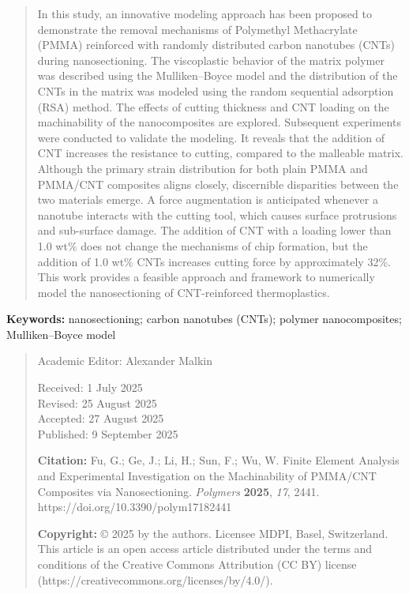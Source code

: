 \documentclass{article}
\begin{document}
\begin{quote}
In this study, an innovative modeling approach has been proposed to demonstrate the removal mechanisms of Polymethyl Methacrylate (PMMA) reinforced with randomly distributed carbon nanotubes (CNTs) during nanosectioning. The viscoplastic behavior of the matrix polymer was described using the Mulliken–Boyce model and the distribution of the CNTs in the matrix was modeled using the random sequential adsorption (RSA) method. The effects of cutting thickness and CNT loading on the machinability of the nanocomposites are explored. Subsequent experiments were conducted to validate the modeling. It reveals that the addition of CNT increases the resistance to cutting, compared to the malleable matrix. Although the primary strain distribution for both plain PMMA and PMMA/CNT composites aligns closely, discernible disparities between the two materials emerge. A force augmentation is anticipated whenever a nanotube interacts with the cutting tool, which causes surface protrusions and sub-surface damage. The addition of CNT with a loading lower than 1.0 wt\% does not change the mechanisms of chip formation, but the addition of 1.0 wt\% CNTs increases cutting force by approximately 32\%. This work provides a feasible approach and framework to numerically model the nanosectioning of CNT-reinforced thermoplastics.
\end{quote}

\noindent\textbf{Keywords:} nanosectioning; carbon nanotubes (CNTs); polymer nanocomposites; Mulliken–Boyce model

\begin{quote}\small
\noindent Academic Editor: Alexander Malkin

\noindent Received: 1 July 2025\\
Revised: 25 August 2025\\
Accepted: 27 August 2025\\
Published: 9 September 2025

\noindent\textbf{Citation:} Fu, G.; Ge, J.; Li, H.; Sun, F.; Wu, W. Finite Element Analysis and Experimental Investigation on the Machinability of PMMA/CNT Composites via Nanosectioning. \emph{Polymers} \textbf{2025}, \emph{17}, 2441. https://doi.org/10.3390/polym17182441

\noindent\textbf{Copyright:} © 2025 by the authors. Licensee MDPI, Basel, Switzerland. This article is an open access article distributed under the terms and conditions of the Creative Commons Attribution (CC BY) license (https://creativecommons.org/licenses/by/4.0/).
\end{quote}
\end{document}
